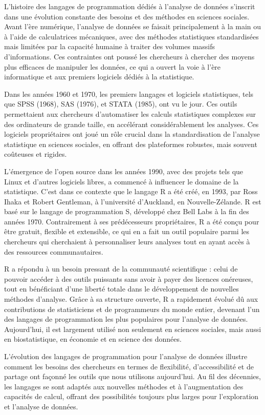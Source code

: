 \documentclass[
  letterpaper,
  DIV=11,
  numbers=noendperiod]{scrreprt}
\begin{document}
L'histoire des langages de programmation dédiés à l'analyse de données
s'inscrit dans une évolution constante des besoins et des méthodes en
sciences sociales. Avant l'ère numérique, l'analyse de données se
faisait principalement à la main ou à l'aide de calculatrices
mécaniques, avec des méthodes statistiques standardisées mais limitées
par la capacité humaine à traiter des volumes massifs d'informations.
Ces contraintes ont poussé les chercheurs à chercher des moyens plus
efficaces de manipuler les données, ce qui a ouvert la voie à l'ère
informatique et aux premiers logiciels dédiés à la statistique.

Dans les années 1960 et 1970, les premiers langages et logiciels
statistiques, tels que SPSS (1968), SAS (1976), et STATA (1985), ont vu
le jour. Ces outils permettaient aux chercheurs d'automatiser les
calculs statistiques complexes sur des ordinateurs de grande taille, en
accélérant considérablement les analyses. Ces logiciels propriétaires
ont joué un rôle crucial dans la standardisation de l'analyse
statistique en sciences sociales, en offrant des plateformes robustes,
mais souvent coûteuses et rigides.

L'émergence de l'open source dans les années 1990, avec des projets tels
que Linux et d'autres logiciels libres, a commencé à influencer le
domaine de la statistique. C'est dans ce contexte que le langage R a été
créé, en 1993, par Ross Ihaka et Robert Gentleman, à l'université
d'Auckland, en Nouvelle-Zélande. R est basé sur le langage de
programmation S, développé chez Bell Labs à la fin des années 1970.
Contrairement à ses prédécesseurs propriétaires, R a été conçu pour être
gratuit, flexible et extensible, ce qui en a fait un outil populaire
parmi les chercheurs qui cherchaient à personnaliser leurs analyses tout
en ayant accès à des ressources communautaires.

R a répondu à un besoin pressant de la communauté scientifique : celui
de pouvoir accéder à des outils puissants sans avoir à payer des
licences onéreuses, tout en bénéficiant d'une liberté totale dans le
développement de nouvelles méthodes d'analyse. Grâce à sa structure
ouverte, R a rapidement évolué dû aux contributions de statisticiens et
de programmeurs du monde entier, devenant l'un des langages de
programmation les plus populaires pour l'analyse de données.
Aujourd'hui, il est largement utilisé non seulement en sciences
sociales, mais aussi en biostatistique, en économie et en science des
données.

L'évolution des langages de programmation pour l'analyse de données
illustre comment les besoins des chercheurs en termes de flexibilité,
d'accessibilité et de partage ont façonné les outils que nous utilisons
aujourd'hui. Au fil des décennies, les langages se sont adaptés aux
nouvelles méthodes et à l'augmentation des capacités de calcul, offrant
des possibilités toujours plus larges pour l'exploration et l'analyse de
données.
\end{document}
